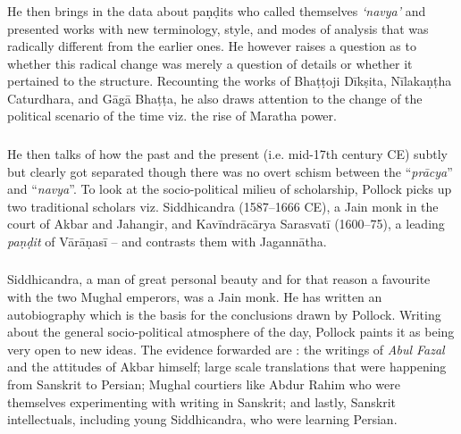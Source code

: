 \subsubsection{} He then brings in the data about paṇḍits who called themselves {\sl ‘navya’} and presented works with new terminology, style, and modes of analysis that was radically different from the earlier ones. He however raises a question as to whether this radical change was merely a question of details or whether it pertained to the structure. Recounting the works of Bhaṭṭoji Dīkṣita, Nīlakaṇṭha Caturdhara, and Gāgā Bhaṭṭa, he also draws attention to the change of the political scenario of the time viz. the rise of Maratha power.

\subsubsection{} He then talks of how the past and the present (i.e. mid-17th century CE) subtly but clearly got separated though there was no overt schism between the “{\sl prācya}” and “{\sl navya}”. To look at the socio-political milieu of scholarship, Pollock picks up two traditional scholars viz. Siddhicandra (1587--1666 CE), a Jain monk in the court of Akbar and Jahangir, and Kavīndrācārya Sarasvatī (1600--75), a leading {\sl paṇḍit} of Vārāṇasī -- and contrasts them with Jagannātha.

\subsubsection{} Siddhicandra, a man of great personal beauty and for that reason a favourite with the two Mughal emperors, was a Jain monk. He has written an autobiography which is the basis for the conclusions drawn by Pollock. Writing about the general socio-political atmosphere of the day, Pollock paints it as being very open to new ideas. The evidence forwarded are : the writings of {\sl Abul Fazal} and the attitudes of Akbar himself; large scale translations that were happening from Sanskrit to Persian; Mughal courtiers like Abdur Rahim who were themselves experimenting with writing in Sanskrit; and lastly, Sanskrit intellectuals, including young Siddhicandra, who were learning Persian.


